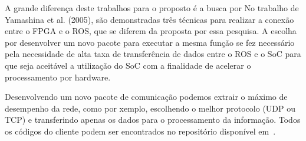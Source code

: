 A grande diferença deste trabalhos para o proposto é a busca por No trabalho de Yamashina et al. (2005), são demonstradas três técnicas para realizar a conexão entre o FPGA e o ROS, que se diferem da proposta por essa pesquisa. A escolha por desenvolver um novo pacote para executar a mesma função se fez necessário pela necessidade de alta taxa de transferência de dados entre o ROS e o SoC para que seja aceitável a utilização do SoC com a finalidade de acelerar o processamento por hardware. 

Desenvolvendo um novo pacote de comunicação podemos extrair o máximo de desempenho da rede, como por  xemplo, escolhendo o melhor protocolo (UDP ou TCP) e transferindo apenas os dados para o processamento da informação. Todos os códigos do cliente podem ser encontrados no repositório disponível em~\cite{interface-socket}.
